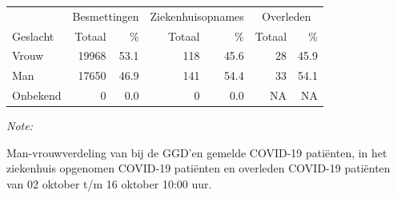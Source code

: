 \documentclass[
  english,
  man,floatsintext]{apa6}
\begin{document}
\begin{table}
\centering\begingroup\fontsize{11}{13}\selectfont

\begin{threeparttable}
\begin{tabular}{lrrrrrr}
\toprule
\multicolumn{1}{c}{ } & \multicolumn{2}{c}{Besmettingen} & \multicolumn{2}{c}{Ziekenhuisopnames} & \multicolumn{2}{c}{Overleden} \\
\cmidrule(l{3pt}r{3pt}){2-3} \cmidrule(l{3pt}r{3pt}){4-5} \cmidrule(l{3pt}r{3pt}){6-7}
Geslacht & Totaal & \% & Totaal & \% & Totaal & \%\\
\midrule
Vrouw & 19968 & 53.1 & 118 & 45.6 & 28 & 45.9\\
Man & 17650 & 46.9 & 141 & 54.4 & 33 & 54.1\\
Onbekend & 0 & 0.0 & 0 & 0.0 & NA & NA\\
\bottomrule
\end{tabular}
\begin{tablenotes}
\item \textit{Note: } 
\item Man-vrouwverdeling van bij de GGD’en gemelde COVID-19 patiënten, in het ziekenhuis opgenomen COVID-19 patiënten en overleden COVID-19 patiënten van 02 oktober t/m 16 oktober 10:00 uur.
\end{tablenotes}
\end{threeparttable}
\endgroup{}
\end{table}
\newpage
\end{document}

